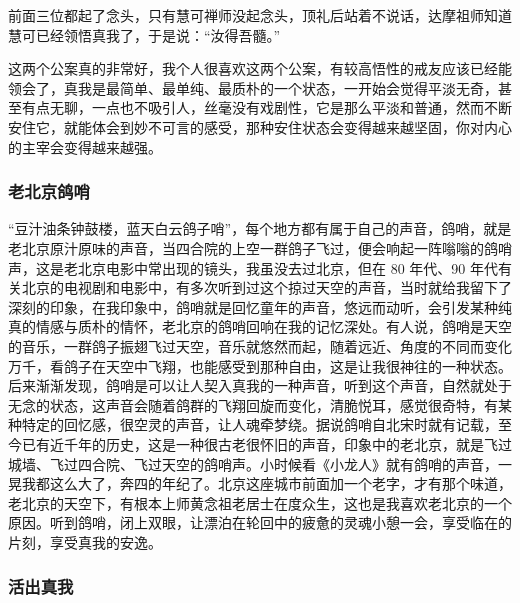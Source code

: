 前面三位都起了念头，只有慧可禅师没起念头，顶礼后站着不说话，达摩祖师知道慧可已经领悟真我了，于是说：“汝得吾髓。”

这两个公案真的非常好，我个人很喜欢这两个公案，有较高悟性的戒友应该已经能领会了，真我是最简单、最单纯、最质朴的一个状态，一开始会觉得平淡无奇，甚至有点无聊，一点也不吸引人，丝毫没有戏剧性，它是那么平淡和普通，然而不断安住它，就能体会到妙不可言的感受，那种安住状态会变得越来越坚固，你对内心的主宰会变得越来越强。

\subsubsection{老北京鸽哨}

“豆汁油条钟鼓楼，蓝天白云鸽子哨”，每个地方都有属于自己的声音，鸽哨，就是老北京原汁原味的声音，当四合院的上空一群鸽子飞过，便会响起一阵嗡嗡的鸽哨声，这是老北京电影中常出现的镜头，我虽没去过北京，但在 80 年代、90 年代有关北京的电视剧和电影中，有多次听到过这个掠过天空的声音，当时就给我留下了深刻的印象，在我印象中，鸽哨就是回忆童年的声音，悠远而动听，会引发某种纯真的情感与质朴的情怀，老北京的鸽哨回响在我的记忆深处。有人说，鸽哨是天空的音乐，一群鸽子振翅飞过天空，音乐就悠然而起，随着远近、角度的不同而变化万千，看鸽子在天空中飞翔，也能感受到那种自由，这是让我很神往的一种状态。后来渐渐发现，鸽哨是可以让人契入真我的一种声音，听到这个声音，自然就处于无念的状态，这声音会随着鸽群的飞翔回旋而变化，清脆悦耳，感觉很奇特，有某种特定的回忆感，很空灵的声音，让人魂牵梦绕。据说鸽哨自北宋时就有记载，至今已有近千年的历史，这是一种很古老很怀旧的声音，印象中的老北京，就是飞过城墙、飞过四合院、飞过天空的鸽哨声。小时候看《小龙人》就有鸽哨的声音，一晃我都这么大了，奔四的年纪了。北京这座城市前面加一个老字，才有那个味道，老北京的天空下，有根本上师黄念祖老居士在度众生，这也是我喜欢老北京的一个原因。听到鸽哨，闭上双眼，让漂泊在轮回中的疲惫的灵魂小憩一会，享受临在的片刻，享受真我的安逸。

\subsubsection{活出真我}

